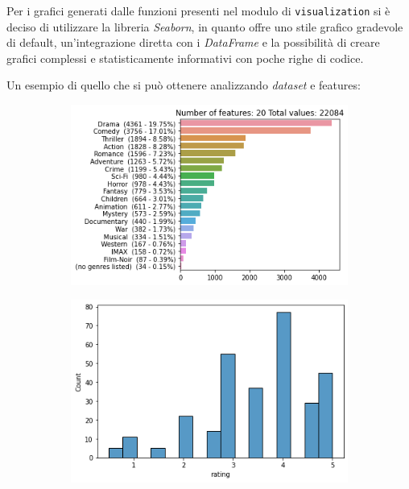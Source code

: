 Per i grafici generati dalle funzioni presenti nel modulo di \texttt{visualization} si è deciso di utilizzare la libreria \textit{Seaborn}, in quanto offre uno stile grafico gradevole di default, un'integrazione diretta con i \textit{DataFrame} e la possibilità di creare grafici complessi e statisticamente informativi con poche righe di codice.

Un esempio di quello che si può ottenere analizzando \textit{dataset} e features:

\begin{figure}[H]
    \centering

    \begin{subfigure}[b]{0.60\textwidth}
        \includegraphics[width=\textwidth]{figures/visualization/output.png}
    \end{subfigure}
    \hfill
    \begin{subfigure}[b]{0.49\textwidth}
        \includegraphics[width=\textwidth]{figures/visualization/output2.png}

\end{subfigure}
\end{figure}
